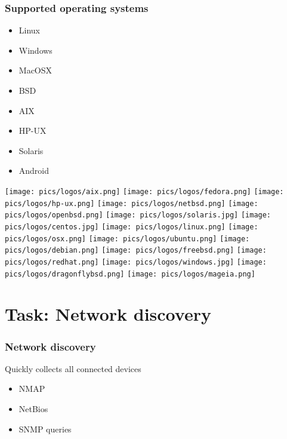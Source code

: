 \documentclass{beamer}
\begin{document}
\begin{frame}
    \frametitle{Supported operating systems}

    \begin{itemize}
        \item Linux
        \item Windows
        \item MacOSX
        \item BSD
        \item AIX
        \item HP-UX
        \item Solaris
        \item Android
    \end{itemize}


\texttt{[image: pics/logos/aix.png]}
\texttt{[image: pics/logos/fedora.png]}
\texttt{[image: pics/logos/hp-ux.png]}
\texttt{[image: pics/logos/netbsd.png]}
\texttt{[image: pics/logos/openbsd.png]}
\texttt{[image: pics/logos/solaris.jpg]}
\texttt{[image: pics/logos/centos.jpg]}
\texttt{[image: pics/logos/linux.png]}
\texttt{[image: pics/logos/osx.png]}
\texttt{[image: pics/logos/ubuntu.png]}
\texttt{[image: pics/logos/debian.png]}
\texttt{[image: pics/logos/freebsd.png]}
\texttt{[image: pics/logos/redhat.png]}
\texttt{[image: pics/logos/windows.jpg]}
\texttt{[image: pics/logos/dragonflybsd.png]}
\texttt{[image: pics/logos/mageia.png]}

\end{frame}

\section{Task: Network discovery}

\begin{frame}
    \frametitle{Network discovery}

    \begin{block}{Quickly collects all connected devices}
    \begin{itemize}
      \item NMAP 
      \item NetBios
      \item SNMP queries
    \end{itemize}
    \end{block}

\end{frame}
\end{document}
